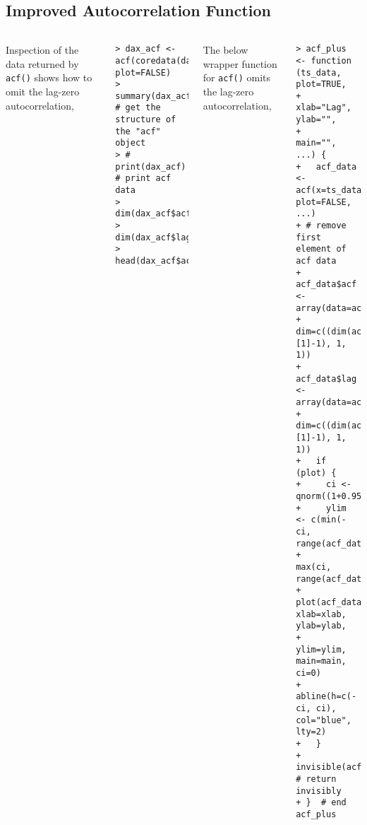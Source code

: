 \documentclass[10pt]{beamer}\usepackage[]{graphicx}\usepackage[]{color}
\makeatletter
\newenvironment{kframe}{%
 \def\at@end@of@kframe{}%
 \ifinner\ifhmode%
  \def\at@end@of@kframe{\end{minipage}}%
  \begin{minipage}{\columnwidth}%
 \fi\fi%
 \def\FrameCommand##1{\hskip\@totalleftmargin \hskip-\fboxsep
 \colorbox{shadecolor}{##1}\hskip-\fboxsep
     \hskip-\linewidth \hskip-\@totalleftmargin \hskip\columnwidth}%
 \MakeFramed {\advance\hsize-\width
   \@totalleftmargin\z@ \linewidth\hsize
   \@setminipage}}%
 {\par\unskip\endMakeFramed%
 \at@end@of@kframe}
\newenvironment{knitrout}{}{} %
\makeatother
\begin{document}
\subsection{Improved Autocorrelation Function}
\begin{frame}[fragile,t]{\subsecname}
\vspace{-1em}
\begin{block}{}
  \begin{columns}[T]
      Inspection of the data returned by \texttt{acf()} shows how to omit the lag-zero autocorrelation,
\begin{knitrout}\scriptsize
{}\color{fgcolor}\begin{kframe}
\begin{verbatim}
> dax_acf <- acf(coredata(dax_rets), plot=FALSE)
> summary(dax_acf)  # get the structure of the "acf" object
> # print(dax_acf)  # print acf data
> dim(dax_acf$acf)
> dim(dax_acf$lag)
> head(dax_acf$acf)
\end{verbatim}
\end{kframe}
\end{knitrout}
      The below wrapper function for \texttt{acf()} omits the lag-zero autocorrelation,
\begin{knitrout}\scriptsize
{}\color{fgcolor}\begin{kframe}
\begin{verbatim}
> acf_plus <- function (ts_data, plot=TRUE,
+                 xlab="Lag", ylab="",
+                 main="", ...) {
+   acf_data <- acf(x=ts_data, plot=FALSE, ...)
+ # remove first element of acf data
+   acf_data$acf <-  array(data=acf_data$acf[-1],
+     dim=c((dim(acf_data$acf)[1]-1), 1, 1))
+   acf_data$lag <-  array(data=acf_data$lag[-1],
+     dim=c((dim(acf_data$lag)[1]-1), 1, 1))
+   if (plot) {
+     ci <- qnorm((1+0.95)/2)*sqrt(1/length(ts_data))
+     ylim <- c(min(-ci, range(acf_data$acf[-1])),
+         max(ci, range(acf_data$acf[-1])))
+     plot(acf_data, xlab=xlab, ylab=ylab,
+    ylim=ylim, main=main, ci=0)
+     abline(h=c(-ci, ci), col="blue", lty=2)
+   }
+   invisible(acf_data)  # return invisibly
+ }  # end acf_plus
\end{verbatim}
\end{kframe}
\end{knitrout}
  \end{columns}
\end{block}

\end{frame}
\end{document}

